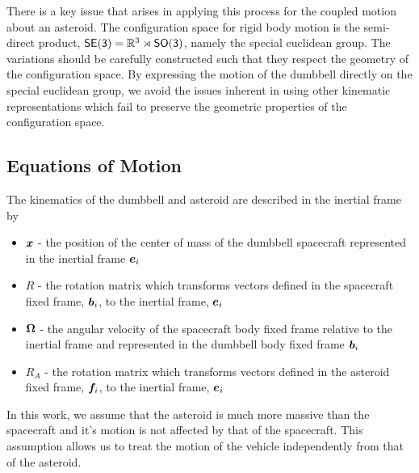 \documentclass[letterpaper, paper,11pt]{AAS}		%
\begin{document}
There is a key issue that arises in applying this process for the coupled motion about an asteroid.
The configuration space for rigid body motion is the semi-direct product, \(\mathsf{SE(3)} = \mathbb{R}^3 \rtimes \mathsf{SO(3)} \), namely the special euclidean group.
The variations should be carefully constructed such that they respect the geometry of the configuration space.
By expressing the motion of the dumbbell directly on the special euclidean group, we avoid the issues inherent in using other kinematic representations which fail to preserve the geometric properties of the configuration space.

\subsection{Equations of Motion}

The kinematics of the dumbbell and asteroid are described in the inertial frame by
\begin{itemize}
    \item \( \bm{x} \) - the position of the center of mass of the dumbbell spacecraft represented in the inertial frame \( \bm{e}_i\)
    \item \( R \) - the rotation matrix which transforms vectors defined in the spacecraft fixed frame, \( \bm{b}_i \), to the inertial frame, \( \bm{e}_i \)
    \item \( \bm{\Omega} \) - the angular velocity of the spacecraft body fixed frame relative to the inertial frame and represented in the dumbbell body fixed frame \( \bm{b}_i \)
    \item \( R_A \) - the rotation matrix which transforms vectors defined in the asteroid fixed frame, \( \bm{f}_i \), to the inertial frame, \( \bm{e}_i \)
\end{itemize}
In this work, we assume that the asteroid is much more massive than the spacecraft and it's motion is not affected by that of the spacecraft.
This assumption allows us to treat the motion of the vehicle independently from that of the asteroid. 
\end{document}
